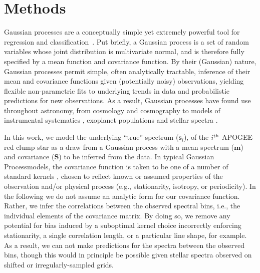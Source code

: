\documentclass[a4paper,fleqn,usenatbib]{mnras}
\newcommand{\specmean}{{\bm m}}
\newcommand{\speccov}{{\bm S}}
\newcommand{\objspec}{{\bm s}}
\begin{document}
\section{Methods}

Gaussian processes are a conceptually simple yet extremely powerful tool for regression and classification~\citep{Rasmussen_Williams}. Put briefly, a Gaussian process is a set of random variables whose joint distribution is multivariate normal, and is therefore fully specified by a mean function and covariance function. By their (Gaussian) nature, Gaussian processes permit simple, often analytically tractable, inference of their mean and covariance functions given (potentially noisy) observations, yielding flexible non-parametric fits to underlying trends in data and probabilistic predictions for new observations. As a result, Gaussian processes have found use throughout astronomy, from cosmology \citep{Bond_etal:1987} and cosmography \citep{Shafieloo_etal:2012} to models of instrumental systematics \citep{Gibson_etal:2012}, exoplanet populations \citep{DFM_etal:2014} and stellar spectra \citep{Czekala_etal:2017}.

In this work, we model the underlying ``true'' spectrum ($\objspec_i$), of the $i^{\rm th}$ APOGEE red clump star as a draw from a Gaussian process with a mean spectrum ($\specmean$) and covariance ($\speccov$) to be inferred from the data. In typical Gaussian Processmodels, the covariance function is taken to be one of a number of standard kernels \citep{Rasmussen_Williams}, chosen to reflect known or assumed properties of the observation and/or physical process (e.g., stationarity, isotropy, or periodicity). In the following we do not assume an analytic form for our covariance function. Rather, we infer the correlations between the observed spectral bins, i.e., the individual elements of the covariance matrix. By doing so, we remove any potential for bias induced by a suboptimal kernel choice incorrectly enforcing stationarity, a single correlation length, or a particular line shape, for example. As a result, we can not make predictions for the spectra between the observed bins, though this would in principle be possible given stellar spectra observed on shifted or irregularly-sampled grids.
\end{document}

